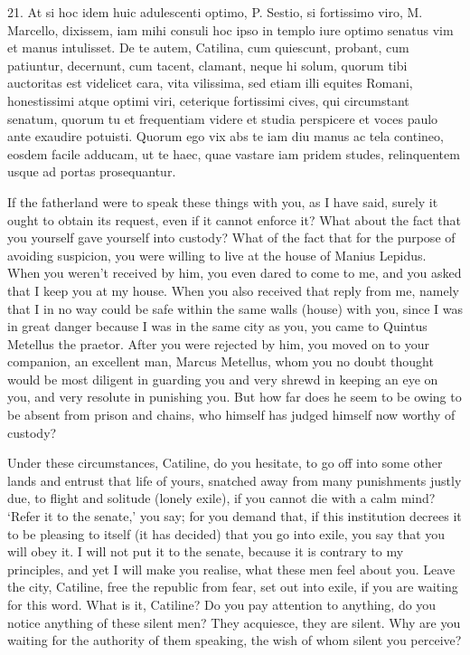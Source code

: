 {  21. At si hoc idem huic adulescenti optimo, P. Sestio, si fortissimo viro, M. Marcello, dixissem, iam mihi consuli hoc ipso in templo iure optimo senatus vim et manus intulisset. De te autem, Catilina, cum quiescunt, probant, cum patiuntur, decernunt, cum tacent, clamant, neque hi solum, quorum tibi auctoritas est videlicet cara, vita vilissima, sed etiam illi equites Romani, honestissimi atque optimi viri, ceterique fortissimi cives, qui circumstant senatum, quorum tu et frequentiam videre et studia perspicere et voces paulo ante exaudire potuisti. Quorum ego vix abs te iam diu manus ac tela contineo, eosdem facile adducam, ut te haec, quae vastare iam pridem studes, relinquentem usque ad portas prosequantur. 
}{
  If the fatherland were to speak these things with you, as I have said, surely it ought to obtain its request, even if it cannot enforce it? What about the fact that you yourself gave yourself into custody? What of the fact that for the purpose of avoiding suspicion, you were willing to live at the house of Manius Lepidus. When you weren’t received by him, you even dared to come to me, and you asked that I keep you at my house. When you also received that reply from me, namely that I in no way could be safe within the same walls (house) with you, since I was in great danger because I was in the same city as you, you came to Quintus Metellus the praetor. After you were rejected by him, you moved on to your companion, an excellent man, Marcus Metellus, whom you no doubt thought would be most diligent in guarding you and very shrewd in keeping an eye on you, and very resolute in punishing you. But how far does he seem to be owing to be absent from prison and chains, who himself has judged himself now worthy of custody?

  Under these circumstances, Catiline, do you hesitate, to go off into some other lands and entrust that life of yours, snatched away from many punishments justly due, to flight and solitude (lonely exile), if you cannot die with a calm mind? `Refer it to the senate,' you say; for you demand that, if this institution decrees it to be pleasing to itself  (it has decided) that you go into exile, you say that you will obey it. I will not put it to the senate, because it is contrary to my principles, and yet I will make you realise, what these men feel about you. Leave the city, Catiline, free the republic from fear, set out into exile, if you are waiting for this word. What is it, Catiline? Do you pay attention to anything, do you notice anything of these silent men? They acquiesce, they are silent. Why are you waiting for the authority of them speaking, the wish of whom silent you perceive?

}

